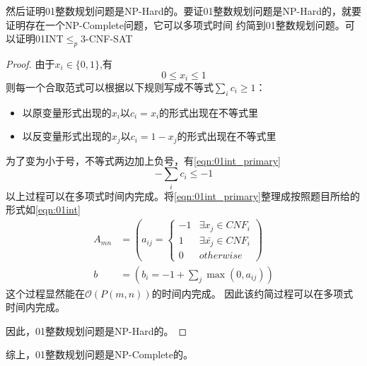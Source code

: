 \documentclass[a4paper,twoside]{article}
\begin{document}
\begin{spacing}{1.2}
然后证明01整数规划问题是NP-Hard的。要证01整数规划问题是NP-Hard的，就要证明存在一个NP-Complete问题，它可以多项式时间
约简到01整数规划问题。可以证明01INT$\le_p$3-CNF-SAT
\begin{proof}
由于$x_i\in \{0,1\}$,有
\[
	0\le x_i\le 1
\]
则每一个合取范式可以根据以下规则写成不等式$\sum_i c_i \ge 1$：
\begin{itemize}
	\item 以原变量形式出现的$x_i$以$c_i=x_i$的形式出现在不等式里
	\item 以反变量形式出现的$x_j$以$c_i=1-x_j$的形式出现在不等式里
\end{itemize}
为了变为小于号，不等式两边加上负号，有\eqref{eqn:01int_primary}
\begin{equation}
	\label{eqn:01int_primary}
	-\sum_i c_i \le -1
\end{equation}
以上过程可以在多项式时间内完成。将\eqref{eqn:01int_primary}整理成按照题目所给的形式如\eqref{eqn:01int}
\begin{equation}
	\label{eqn:01int}
	\begin{aligned}
		A_{mn}&=\left( a_{ij}=\begin{cases}
			-1 & \exists x_j \in CNF_i\\
			1 & \exists \bar{x_j} \in CNF_i\\
			0 & otherwise
		\end{cases} 
		\right) \\
		b&=\left( b_i=-1+\sum_j \mathop{\max}(0,a_{ij}) \right)
	\end{aligned}
\end{equation}
这个过程显然能在$\mathcal{O}(P(m,n))$的时间内完成。
因此该约简过程可以在多项式时间内完成。

因此，01整数规划问题是NP-Hard的。
\end{proof}

综上，01整数规划问题是NP-Complete的。

\end{spacing}
\end{document}
